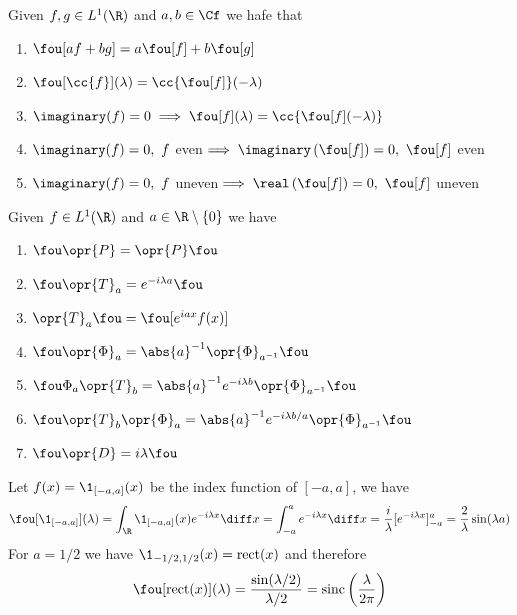 \documentclass[../mmf.tex]{subfiles}
\begin{document}
\begin{thm}
	Given $f,g\in L^1(\R)$ and $a,b\in\Cf$ we hafe that
	\begin{enumerate}
	\item $\fou[af+bg]=a\fou[f]+b\fou[g]$
	\item $\fou[\cc{f}](\lambda)=\cc{\fou[f]}(-\lambda)$
	\item $\imaginary(f)=0\implies{}\fou[f](\lambda)=\cc{\fou[f](-\lambda)}$
	\item $\imaginary(f)=0,\ f$ even$\implies{}\imaginary\left( \fou[f] \right)=0,\ \fou[f]$ even
	\item $\imaginary(f)=0,\ f$ uneven$\implies{}\real\left(\fou[f]\right)=0,\ \fou[f]$ uneven
	\end{enumerate}
\end{thm}
\begin{thm}
	Given $f\in L^1(\R)$ and $a\in\R\setminus\{0\}$ we have
	\begin{enumerate}
	\item $\fou\opr{P}=\opr{P}\fou$
	\item $\fou\opr{T}_a=e^{-i\lambda a}\fou$
	\item $\opr{T}_a\fou=\fou[e^{iax}f(x)]$
	\item $\fou\opr{\Phi}_a=\abs{a}^{-1}\opr{\Phi}_{a^{-1}}\fou$
	\item $\fou\Phi_a\opr{T}_b=\abs{a}^{-1}e^{-i\lambda b}\opr{\Phi}_{a^{-1}}\fou$
	\item $\fou\opr{T}_b\opr{\Phi}_a=\abs{a}^{-1}e^{-i\lambda b/a}\opr{\Phi}_{a^{-1}}\fou$
	\item $\fou\opr{D}=i\lambda\fou$
	\end{enumerate}
\end{thm}
\begin{eg}
	Let $f(x)=\1_{[-a,a]}(x)$ be the index function of $[-a,a]$, we have
	\begin{equation*}
		\fou[\1_{[-a,a]}](\lambda)=\int_{\R}^{}\1_{[-a,a]}(x)e^{-i\lambda x}\diff x=\int_{-a}^{a}e^{-i\lambda x}\diff x=\frac{i}{\lambda}[e^{-i\lambda x}]_{-a}^a=\frac{2}{\lambda}\sin(\lambda a)
	\end{equation*}
	For $a=1/2$ we have $\1_{-1/2,1/2}(x)=\mathrm{rect}(x)$ and therefore
	\begin{equation*}
		\fou[\mathrm{rect}(x)](\lambda)=\frac{\sin(\lambda/2)}{\lambda/2}=\mathrm{sinc}\left( \frac{\lambda}{2\pi} \right)
	\end{equation*}
\end{eg}
\end{document}
